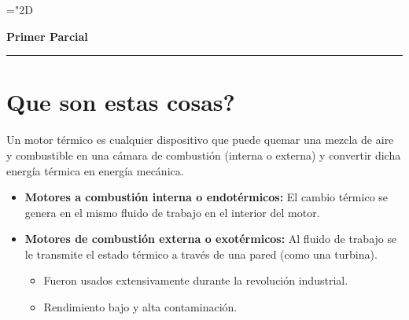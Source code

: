 \newcommand{\rc}{R_c}
\newcommand{\Calorif}{\mbox{\large$\mathbf{c}$}}
\newcommand{\rp}{R_p}
\newcommand{\grad}{$^\circ$}
\newcommand{\Fp}{F_P}
\newcommand{\Peff}{P}
\newcommand{\ideal}{{ideal}}
\newcommand{\perd}{{perd.}}
\newcommand{\Pideal}{P_\ideal}
\newcommand{\Pperd}{P_\perd}
\newcommand{\Pind}{P_i}
\newcommand{\pmi}{p_{mi}}
\newcommand{\Pot}{{ \mbox{\tiny$P$}}}
\newcommand{\Potmax}{{ \mbox{\tiny$P_\max$}}}
\newcommand{\Torq}{{ \mbox{\tiny$T$}}}
\newcommand{\Torqmax}{{ \mbox{\tiny$T_\max$}}}
\newcommand{\Ce}{C_e}
\newcommand{\pme}{p_{me}}
\newcommand{\etaeff}{\eta_{total}}
\newcommand{\etavol}{\eta_{{\mbox{\tiny$V$}}}}
\newcommand{\util}{\acute{u}til}

\renewcommand{\min}{{m\textrm{í}n}}
\renewcommand{\max}{{m\acute{a}x}}
\newcommand{\ctegas}{k}
\newcommand{\rv}{{R_{\mbox{\tiny $V$}}}}
 \mathchardef\mhyphen="2D
 \newcommand{\hyph}{\,\mhyphen}
 \vspace{.9cm}
{\centering 
{\bf \LARGE Primer Parcial \par}
}
\begin{center}
\vspace{-.2cm}\rule{3cm}{2pt}\par
\vspace{-.2cm}
\end{center}

\section{Que son estas cosas?}

Un motor térmico es cualquier dispositivo que puede quemar una mezcla de aire y combustible en una cámara de combustión (interna o externa) y convertir dicha energía térmica en energía mecánica.

\begin{itemize}
    \item {\bf Motores a combustión interna o endotérmicos:} El cambio térmico se genera en el mismo fluido de trabajo en el interior del motor.
    \item {\bf Motores de combustión externa o exotérmicos:} Al fluido de trabajo se le transmite el estado térmico a través de una pared (como una turbina).
    \begin{itemize}
        \item Fueron usados extensivamente durante la revolución industrial.
        \item Rendimiento bajo y alta contaminación.
    \end{itemize}
\end{itemize}

